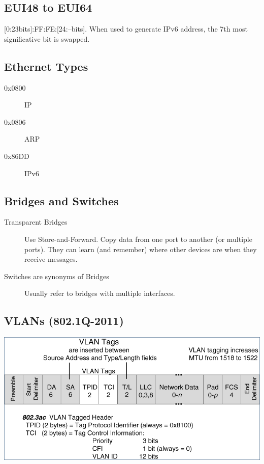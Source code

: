\documentclass{article}
\begin{document}
\subsection{EUI48 to EUI64}

[0:23bits]:FF:FE:[24:--bits]. When used to generate IPv6 address, the 7th most significative bit is swapped.

\subsection{Ethernet Types}

\begin{description}
	\item[0x0800] IP
	\item[0x0806] ARP
	\item[0x86DD] IPv6
\end{description}

\subsection{Bridges and Switches}

\begin{description}
	\item[Transparent Bridges] Use Store-and-Forward. Copy data from one port to another (or multiple ports). They can learn (and remember) where other devices are when they receive messages.
	\item[Switches are synonyms of Bridges] Usually refer to bridges with multiple interfaces.
\end{description}

\subsection{VLANs (802.1Q-2011)}

\centerline{\includegraphics[scale=0.5]{images/VLAN.png}\\[1cm]}
\end{document}
